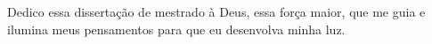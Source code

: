 \vspace*{\fill}

\begin{dedicatoria}
	Dedico essa dissertação de mestrado à Deus, essa força maior, que me guia e ilumina meus pensamentos para que eu desenvolva minha luz.
\end{dedicatoria}
